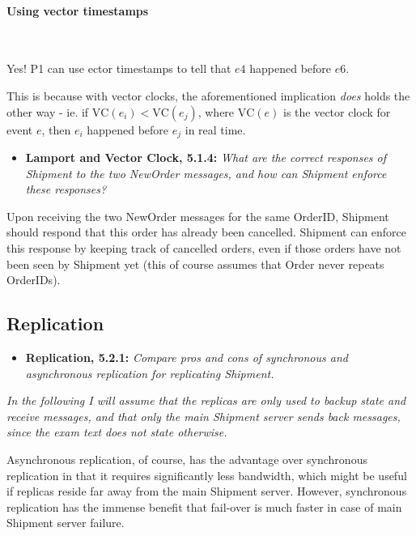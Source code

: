 \paragraph{Using vector timestamps}~\smallskip

Yes! P1 can use ector timestamps to tell that $e4$ happened before $e6$.
\smallskip

This is because with vector clocks, the aforementioned implication \emph{does}
holds the other way - ie. if $\text{VC}(e_i) < \text{VC}(e_j)$, where
$\text{VC}(e)$ is the vector clock for event $e$, then $e_i$ happened before
$e_j$ in real time.



\begin{itemize}
  \item \textbf{Lamport and Vector Clock, 5.1.4:}
        \textit{What are the correct responses of Shipment to the two NewOrder
        messages, and how can Shipment enforce these responses?}
\end{itemize}

Upon receiving the two NewOrder messages for the same OrderID, Shipment should
respond that this order has already been cancelled. Shipment can enforce this
response by keeping track of cancelled orders, even if those orders have not
been seen by Shipment yet (this of course assumes that Order never repeats
OrderIDs).


\sectend

\subsection{Replication}

\begin{itemize}
  \item \textbf{Replication, 5.2.1:}
        \textit{Compare pros and cons of synchronous and asynchronous
        replication for replicating Shipment.}
\end{itemize}

\emph{In the following I will assume that the replicas are only used to backup
state and receive messages, and that only the main Shipment server sends
back messages, since the exam text does not state otherwise.} \medskip

Asynchronous replication, of course, has the advantage over synchronous
replication in that it requires significantly less bandwidth, which might be
useful if replicas reside far away from the main Shipment server. However,
synchronous replication has the immense benefit that fail-over is much faster in
case of main Shipment server failure.

